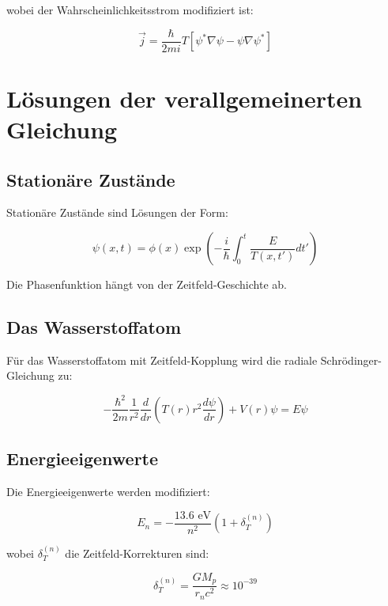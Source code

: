 \documentclass[12pt,a4paper]{report}
\begin{document}
	wobei der Wahrscheinlichkeitsstrom modifiziert ist:
	
	\begin{equation}
		\vec{j} = \frac{\hbar}{2mi}T[\psi^*\nabla\psi - \psi\nabla\psi^*]
	\end{equation}
	
	\section{Lösungen der verallgemeinerten Gleichung}
	
	\subsection{Stationäre Zustände}
	
	Stationäre Zustände sind Lösungen der Form:
	
	\begin{equation}
		\psi(x,t) = \phi(x) \exp\left(-\frac{i}{\hbar}\int_0^t \frac{E}{T(x,t')} dt'\right)
	\end{equation}
	
	Die Phasenfunktion hängt von der Zeitfeld-Geschichte ab.
	
	\subsection{Das Wasserstoffatom}
	
	Für das Wasserstoffatom mit Zeitfeld-Kopplung wird die radiale Schrödinger-Gleichung zu:
	
	\begin{equation}
		-\frac{\hbar^2}{2m}\frac{1}{r^2}\frac{d}{dr}\left(T(r)r^2\frac{d\psi}{dr}\right) + V(r)\psi = E\psi
	\end{equation}
	
	\subsection{Energieeigenwerte}
	
	Die Energieeigenwerte werden modifiziert:
	
	\begin{equation}
		E_n = -\frac{13.6 \text{ eV}}{n^2}\left(1 + \delta_T^{(n)}\right)
	\end{equation}
	
	wobei $\delta_T^{(n)}$ die Zeitfeld-Korrekturen sind:
	
	\begin{equation}
		\delta_T^{(n)} = \frac{GM_p}{r_n c^2} \approx 10^{-39}
	\end{equation}
	
\end{document}
